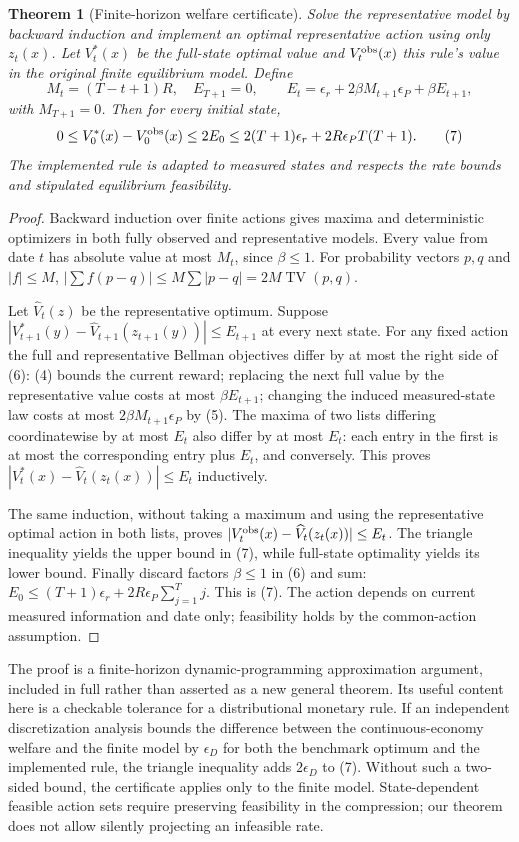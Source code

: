 \documentclass[11pt]{article}
\newtheorem{theorem}{Theorem}
\theoremstyle{remark}
\newcommand{\TV}{\operatorname{TV}}
\begin{document}
\begin{theorem}[Finite-horizon welfare certificate]
Solve the representative model by backward induction and implement an
optimal representative action using only $z_t(x)$. Let $V_t^*(x)$ be the
full-state optimal value and $V_t^{\rm obs}(x)$ this rule's value in the
original finite equilibrium model. Define
\[
 M_t=(T-t+1)R,\quad E_{T+1}=0,\qquad
 E_t=\epsilon_r+2\beta M_{t+1}\epsilon_P+\beta E_{t+1},
 \tag{6}
\]
with $M_{T+1}=0$. Then for every initial state,
\[
 0\leq V_0^*(x)-V_0^{\rm obs}(x)\leq2E_0
 \leq2(T+1)\epsilon_r+2R\epsilon_PT(T+1). \tag{7}
\]
The implemented rule is adapted to measured states and respects the rate
bounds and stipulated equilibrium feasibility.
\end{theorem}
\begin{proof}
Backward induction over finite actions gives maxima and deterministic
optimizers in both fully observed and representative models. Every value
from date $t$ has absolute value at most $M_t$, since $\beta\leq1$.
For probability vectors $p,q$ and $|f|\leq M$,
$|\sum f(p-q)|\leq M\sum|p-q|=2M\TV(p,q)$.

Let $\widehat V_t(z)$ be the representative optimum. Suppose
$|V_{t+1}^*(y)-\widehat V_{t+1}(z_{t+1}(y))|\leq E_{t+1}$ at every
next state. For any fixed action the full and representative Bellman
objectives differ by at most the right side of (6): (4) bounds the
current reward; replacing the next full value by the representative value
costs at most $\beta E_{t+1}$; changing the induced measured-state law
costs at most $2\beta M_{t+1}\epsilon_P$ by (5).
The maxima of two lists differing coordinatewise by at most $E_t$ also
differ by at most $E_t$: each entry in the first is at most the corresponding
entry plus $E_t$, and conversely. This proves
$|V_t^*(x)-\widehat V_t(z_t(x))|\leq E_t$ inductively.

The same induction, without taking a maximum and using the representative
optimal action in both lists, proves
$|V_t^{\rm obs}(x)-\widehat V_t(z_t(x))|\leq E_t$.
The triangle inequality yields the upper bound in (7), while full-state
optimality yields its lower bound. Finally discard factors $\beta\leq1$
in (6) and sum:
$E_0\leq(T+1)\epsilon_r+2R\epsilon_P\sum_{j=1}^Tj$.
This is (7). The action depends on current measured information and date
only; feasibility holds by the common-action assumption.
\end{proof}

The proof is a finite-horizon dynamic-programming approximation argument,
included in full rather than asserted as a new general theorem. Its useful
content here is a checkable tolerance for a distributional monetary rule.
If an independent discretization analysis bounds the difference between
the continuous-economy welfare and the finite model by $\epsilon_D$ for
both the benchmark optimum and the implemented rule, the triangle
inequality adds $2\epsilon_D$ to (7). Without such a two-sided bound,
the certificate applies only to the finite model. State-dependent feasible
action sets require preserving feasibility in the compression; our theorem
does not allow silently projecting an infeasible rate.
\end{document}
